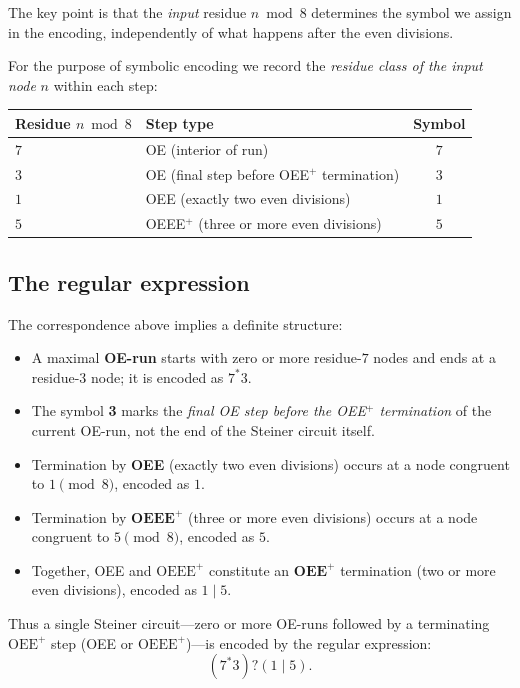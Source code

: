 \documentclass[11pt]{article}
\begin{document}
The key point is that the \emph{input} residue $n \bmod 8$ determines the
symbol we assign in the encoding, independently of what happens after the
even divisions.

For the purpose of symbolic encoding we record the \emph{residue class of the
input node} $n$ within each step:

\begin{center}
\begin{tabular}{llc}
\hline
Residue $n \bmod 8$ & Step type & Symbol \\
\hline
$7$ & OE (interior of run) & $7$ \\
$3$ & OE (final step before OEE$^+$ termination) & $3$ \\
$1$ & OEE (exactly two even divisions) & $1$ \\
$5$ & OEEE$^+$ (three or more even divisions) & $5$ \\
\hline
\end{tabular}
\end{center}

\subsection{The regular expression}

The correspondence above implies a definite structure:

\begin{itemize}
  \item A maximal \textbf{OE-run} starts with zero or more residue-$7$ nodes
        and ends at a residue-$3$ node; it is encoded as $7^*3$.
  \item The symbol \textbf{3} marks the \emph{final OE step before the
        OEE$^+$ termination} of the current OE-run, not the end of the
        Steiner circuit itself.
  \item Termination by \textbf{OEE} (exactly two even divisions) occurs at a
        node congruent to $1 \pmod 8$, encoded as $1$.
  \item Termination by $\mathbf{OEEE}^+$ (three or more even divisions) occurs
        at a node congruent to $5 \pmod 8$, encoded as $5$.
  \item Together, OEE and $\mathrm{OEEE}^+$ constitute an $\mathbf{OEE}^+$
        termination (two or more even divisions), encoded as $1 \mid 5$.
\end{itemize}

Thus a single Steiner circuit---zero or more OE-runs followed by a terminating
$\mathrm{OEE}^+$ step (OEE or $\mathrm{OEEE}^+$)---is encoded by the regular expression:
\[
  \boxed{(7^*3)?(1 \mid 5)}.
\]
\end{document}
